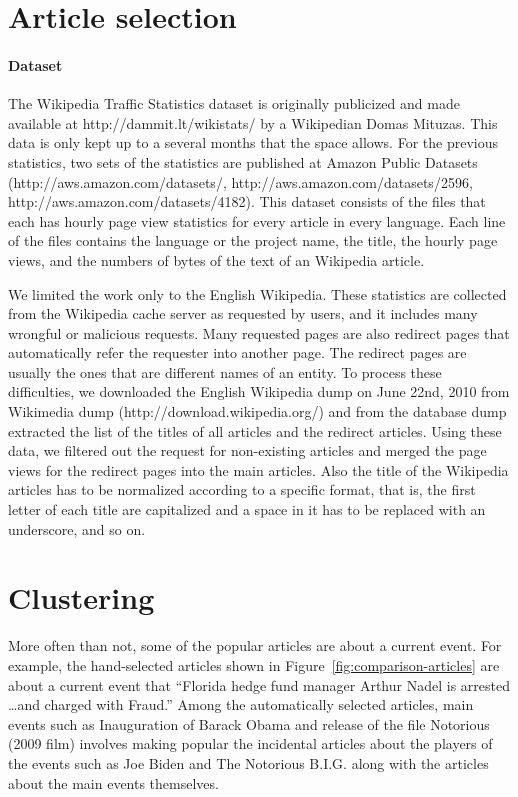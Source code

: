 \documentclass[11pt]{article}
\newcommand{\war}[1]{{\sf\small #1}}
\begin{document}
\section{Article selection}
\paragraph{Dataset}
The Wikipedia Traffic Statistics dataset is originally publicized and made available at http://dammit.lt/wikistats/ by a Wikipedian Domas Mituzas.
This data is only kept up to a several months that the space allows.
For the previous statistics, two sets of the statistics are published at Amazon Public Datasets (http://aws.amazon.com/datasets/, http://aws.amazon.com/datasets/2596, http://aws.amazon.com/datasets/4182).
This dataset consists of the files that each has hourly page view statistics for every article in every language.
Each line of the files contains the language or the project name, the title, the hourly page views, and the numbers of bytes of the text of an Wikipedia article.

We limited the work only to the English Wikipedia.
These statistics are collected from the Wikipedia cache server as requested by users, and it includes many wrongful or malicious requests.
Many requested pages are also redirect pages that automatically refer the requester into another page.
The redirect pages are usually the ones that are different names of an entity.
To process these difficulties, we downloaded the English Wikipedia dump on June 22nd, 2010 from Wikimedia dump (http://download.wikipedia.org/) and from the database dump extracted the list of the titles of all articles and the redirect articles.
Using these data, we filtered out the request for non-existing articles and merged the page views for the redirect pages into the main articles.
Also the title of the Wikipedia articles has to be normalized according to a specific format, that is, the first letter of each title are capitalized and a space in it has to be replaced with an underscore, and so on.

\section{Clustering}
\label{ssec:clustering}

More often than not, some of the popular articles are about a current event.
For example, the hand-selected articles shown in Figure~\ref{fig:comparison-articles} are about a current event that ``Florida hedge fund manager Arthur Nadel is arrested \ldots and charged with Fraud.''
Among the automatically selected articles, main events such as \war{Inauguration of Barack Obama} and release of the file \war{Notorious (2009 film)} involves making popular the incidental articles about the players of the events such as \war{Joe Biden} and \war{The Notorious B.I.G.} along with the articles about the main events themselves.
\end{document}
